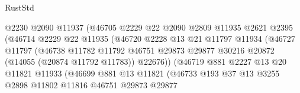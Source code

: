 \begin{lexlean}{RustStd}
\begin{coremodule}
                                  @2230
                                  @2090
                                  @11937
                                  (@46705
                                    @2229
                                    @22
                                    @2090
                                    @2809
                                    @11935
                                    @2621
                                    @2395
                                    (@46714
                                      @2229
                                      @22
                                      @11935
                                      (@46720
                                        @2228
                                        @13
                                        @21
                                        @11797
                                        @11934
                                        (@46727
                                          @11797
                                          (@46738
                                            @11782
                                            @11792
                                            @46751
                                            @29873
                                            @29877
                                            @30216
                                            @20872
                                            (@14055 (@20874 @11792 @11783))
                                            @22676))
                                        (@46719
                                          @881
                                          @2227
                                          @13
                                          @20
                                          @11821
                                          @11933
                                          (@46699
                                            @881
                                            @13
                                            @11821
                                            (@46733
                                              @193
                                              @37
                                              @13
                                              @3255
                                              @2898
                                              @11802
                                              @11816
                                              @46751
                                              @29873
                                              @29877

\end{coremodule}
\end{lexlean}
